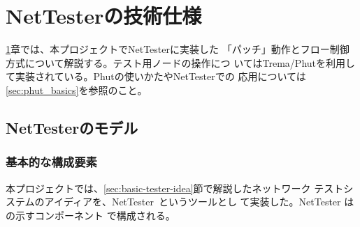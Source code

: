 
\chapter{NetTesterの技術仕様}
\label{chap:nettester-design}

\ref{chap:nettester-design}章では、本プロジェクトでNetTesterに実装した
「パッチ」動作とフロー制御方式について解説する。テスト用ノードの操作につ
いてはTrema/Phutを利用して実装されている。Phutの使いかたやNetTesterでの
応用については\ref{sec:phut_basics}を参照のこと。

 \section{NetTesterのモデル}
 \label{sec:nettester-model}

 \subsection{基本的な構成要素}
 \label{sec:nettester-model}


本プロジェクトでは、\ref{sec:basic-tester-idea}節で解説したネットワーク
テストシステムのアイディアを、NetTester~\cite{nettester}というツールとし
て実装した。NetTester はの示すコンポーネント
で構成される。

